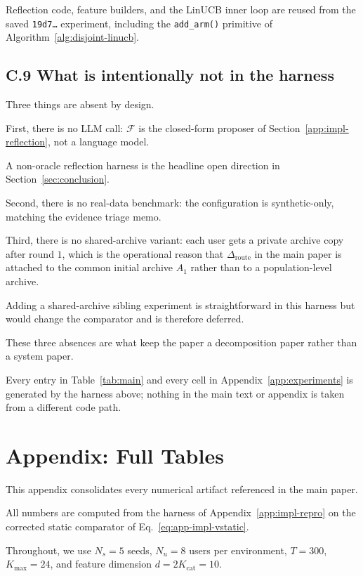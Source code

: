 \documentclass{article} %
\begin{document}
Reflection code, feature builders, and the LinUCB inner loop are reused from the saved \texttt{19d7\ldots} experiment, including the \texttt{add\_arm()} primitive of Algorithm~\ref{alg:disjoint-linucb}.

\subsection{C.9 What is intentionally not in the harness}

\label{app:impl-not-included}

Three things are absent by design.

First, there is no LLM call: $\mathcal F$ is the closed-form proposer of Section~\ref{app:impl-reflection}, not a language model.

A non-oracle reflection harness is the headline open direction in Section~\ref{sec:conclusion}.

Second, there is no real-data benchmark: the configuration is synthetic-only, matching the evidence triage memo.

Third, there is no shared-archive variant: each user gets a private archive copy after round $1$, which is the operational reason that $\Delta_{\mathrm{route}}$ in the main paper is attached to the common initial archive $A_1$ rather than to a population-level archive.

Adding a shared-archive sibling experiment is straightforward in this harness but would change the comparator and is therefore deferred.

These three absences are what keep the paper a decomposition paper rather than a system paper.

Every entry in Table~\ref{tab:main} and every cell in Appendix~\ref{app:experiments} is generated by the harness above; nothing in the main text or appendix is taken from a different code path.

\section{Appendix: Full Tables}

\label{app:tables}

This appendix consolidates every numerical artifact referenced in the main paper.

All numbers are computed from the harness of Appendix~\ref{app:impl-repro} on the corrected static comparator of Eq.~\eqref{eq:app-impl-vstatic}.

Throughout, we use \(N_s=5\) seeds, \(N_u=8\) users per environment, \(T=300\),
\(K_{\max}=24\), and feature dimension \(d=2K_{\mathrm{cat}}=10\).
\end{document}
